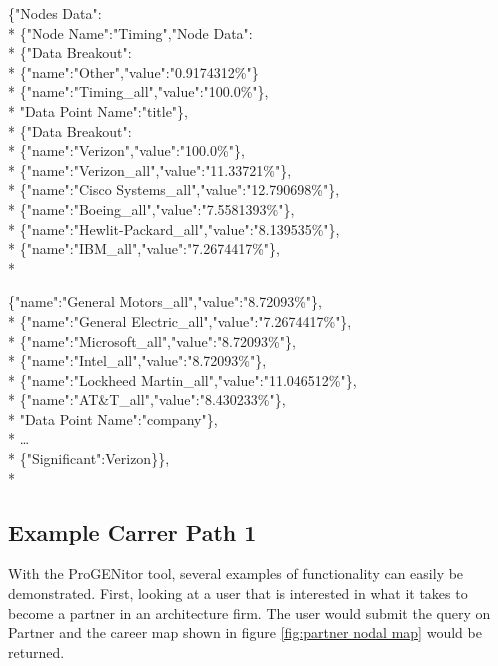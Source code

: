 \noindent \{"Nodes Data":\\*
	\indent \{"Node Name":"Timing","Node Data":\\*
		\indent \{"Data Breakout":\\*
		\indent \indent	\{"name":"Other","value":"0.9174312\%"\}\\*
		\indent	\indent \{"name":"Timing\_all","value":"100.0\%"\},\\*
		\indent	"Data Point Name":"title"\},\\*
		\indent\{"Data Breakout":\\*
		\indent	\indent	\{"name":"Verizon","value":"100.0\%"\},\\*
		\indent	\indent	\{"name":"Verizon\_all","value":"11.33721\%"\},\\*
		\indent	\indent	\{"name":"Cisco Systems\_all","value":"12.790698\%"\},\\*
		\indent	\indent	\{"name":"Boeing\_all","value":"7.5581393\%"\},\\*
		\indent	\indent	\{"name":"Hewlit-Packard\_all","value":"8.139535\%"\},\\*
		\indent	\indent	\{"name":"IBM\_all","value":"7.2674417\%"\},\\*
		
		\indent	\indent	\{"name":"General Motors\_all","value":"8.72093\%"\},\\*
		\indent	\indent	\{"name":"General Electric\_all","value":"7.2674417\%"\},\\*
		\indent	\indent	\{"name":"Microsoft\_all","value":"8.72093\%"\},\\*
		\indent	\indent	\{"name":"Intel\_all","value":"8.72093\%"\},\\*
		\indent	\indent	\{"name":"Lockheed Martin\_all","value":"11.046512\%"\},\\*
		\indent	\indent	\{"name":"AT\&T\_all","value":"8.430233\%"\},\\*
		\indent"Data Point Name":"company"\},\\*
		\indent\ldots\\*
		\indent \{"Significant":Verizon\}\},\\*

\subsection{Example Carrer Path 1}
With the ProGENitor tool, several examples of functionality can easily be
demonstrated.  First, looking at a user that is interested in what it takes to
become a partner in an architecture firm.  The user would submit the query on
Partner and the career map shown in figure \ref{fig:partner nodal map} would be
returned.

